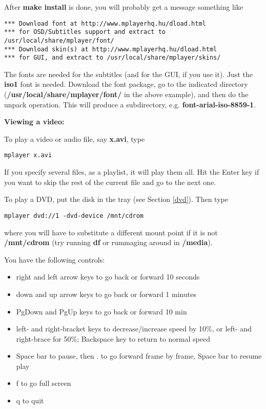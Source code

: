 \documentclass[11pt]{article}
\begin{document}
After {\bf make install} is done, you will probably get a message
something like

\begin{Verbatim}[fontsize=\relsize{-2}]
 *** Download font at http://www.mplayerhq.hu/dload.html
*** for OSD/Subtitles support and extract to
/usr/local/share/mplayer/font/
*** Download skin(s) at http://www.mplayerhq.hu/dload.html
*** for GUI, and extract to /usr/local/share/mplayer/skins/
\end{Verbatim}

The fonts are needed for the subtitles (and for the GUI, if you use it).
Just the {\bf iso1} font is needed.  Download the font package, go to
the indicated directory ({\bf /usr/local/share/mplayer/font/} in the
above example), and then do the unpack operation.  This will produce a
subdirectory, e.g. {\bf font-arial-iso-8859-1}.

{\bf Viewing a video:}

To play a video or audio file, say {\bf x.avi}, type

\begin{Verbatim}[fontsize=\relsize{-2}]
mplayer x.avi
\end{Verbatim}

If you specify several files, as a playlist, it will play them all.  Hit
the Enter key if you want to skip the rest of the current file and go to
the next one.

To play a DVD, put the disk in the tray (see Section \ref{dvd}).  Then
type

\begin{Verbatim}[fontsize=\relsize{-2}]
mplayer dvd://1 -dvd-device /mnt/cdrom
\end{Verbatim}

where you will have to substitute a different mount point if it is not
{\bf /mnt/cdrom} (try running {\bf df} or rummaging around in {\bf
/media}).

You have the following controls:

\begin{itemize}

\item right and left arrow keys to go back or forward 10 seconds

\item down and up arrow keys to go back or forward 1 minutes

\item PgDown and PgUp keys to go back or forward 10 min

\item left- and right-bracket keys to decrease/increase speed by 10\%,
or left- and right-brace for 50\%; Backspace key to return to normal
speed

\item Space bar to pause, then . to go forward frame by frame, Space bar
to resume play

\item f to go full screen

\item q to quit

\end{itemize}
\end{document}
